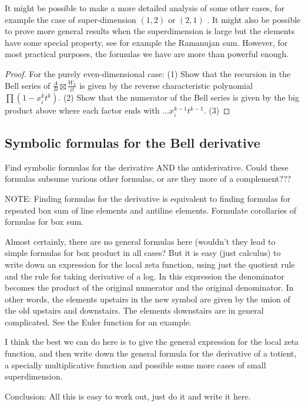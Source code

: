 \begin{remark}
It might be possible to make a more detailed analysis of some other cases, for example the case of super-dimension $(1, 2)$ or $(2, 1)$ . It might also be possible to prove more general results when the superdimension is large but the elements have some special property, see for example the Ramanujan sum. However, for most practical purposes, the formulas we have are more than powerful enough.
\end{remark}


\begin{proof}
For the purely even-dimensional case: (1) Show that the recursion in the Bell series of $\frac{A}{B} \boxtimes \frac{W_k}{\varnothing}$ is given by the reverse characteristic polynomial $\prod (1-x_i^k t^k)$. (2) Show that the numerator of the Bell series is given by the big product above where each factor ends with $\ldots x_i^{k-1} t^{k-1}$. (3) 
\end{proof}



\subsection{Symbolic formulas for the Bell derivative}

\begin{theorem}
Find symbolic formulas for the derivative AND the antiderivative. Could these formulas subsume various other formulas, or are they more of a complement???

NOTE: Finding formulas for the derivative is equivalent to finding formulas for repeated box sum of line elements and antiline elements. Formulate corollaries of formulas for box sum.
 
Almost certainly, there are no general formulas here (wouldn't they lead to simple formulas for box product in all cases? But it is easy (just calculus) to write down an expression for the local zeta function, using just the quotient rule and the rule for taking derivative of a log. In this expression the denominator becomes the product of the original numerator and the original denominator. In other words, the elements upstairs in the new symbol are given by the union of the old upstairs and downstairs. The elements downstairs are in general complicated. See the Euler function for an example.

I think the best we can do here is to give the general expression for the local zeta function, and then write down the general formula for the derivative of a totient, a specially multiplicative function and possible some more cases of small superdimension.

Conclusion: All this is easy to work out, just do it and write it here.
\end{theorem}

